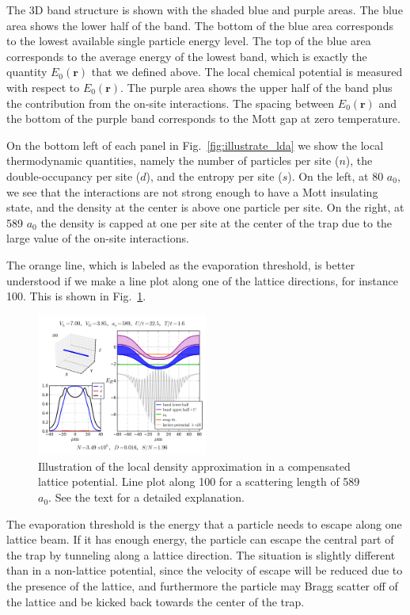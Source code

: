 \documentclass[11pt,letter]{article}
\newcommand{\bv}[1]{\ensuremath{\bm{#1}}}
\begin{document}
The 3D band structure is shown with the shaded blue and purple areas.  The blue
area shows the lower half of the band.  The bottom of the blue area corresponds
to the lowest available single particle energy level.  The top of the blue area
corresponds to the average energy of the lowest band,  which is exactly the
quantity $E_{0}(\bv{r})$ that we defined above.   The local chemical potential
is measured with respect to $E_{0}(\bv{r})$.  The purple area shows the upper
half of the band plus the contribution from the on-site interactions.  The
spacing between $E_{0}(\bv{r})$ and the bottom of the purple band corresponds
to the Mott gap at zero temperature. 

On the bottom left of each panel in Fig.~\ref{fig:illustrate_lda} we show the
local thermodynamic quantities, namely the number of particles per site ($n$),
the double-occupancy per site ($d$), and the entropy per site ($s$).  On the
left, at 80 $a_{0}$, we see that the interactions are not strong enough to have
a Mott insulating state, and the density at the center is above one particle
per site.  On the right, at 589 $a_{0}$ the density is capped at one per site
at the center of the trap due to the large value of the on-site interactions.  

The orange line, which is labeled as the evaporation threshold, is better
understood if we make a line plot along one of the lattice directions, for
instance 100. This is shown in Fig.~\ref{fig:illustrate_evap}. 
\begin{figure}
\centering \includegraphics[width=0.5\textwidth]{../Ut_Comp/100_as0589.png}
\caption[Evaporation threshold in a compensated lattice potential]{\small
Illustration of the local density approximation in a compensated lattice
potential. Line plot along 100 for a scattering length of 589 $a_{0}$. See the
text for a detailed explanation. } \label{fig:illustrate_evap}
\end{figure}
The evaporation threshold is the energy that a particle needs to escape along
one lattice beam.  If it has enough energy, the particle can escape the central
part of the trap by tunneling along a lattice direction.   The situation is
slightly different than in a non-lattice potential, since the velocity of
escape will be reduced due to the presence of the lattice, and furthermore the
particle may Bragg scatter off of the lattice and be kicked back towards the
center of the trap. 
\end{document}

